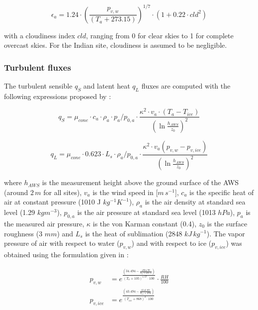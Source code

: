 \begin{equation}
	\epsilon_a=1.24 \cdot (\frac{p_{v,w}}{(T_a+273.15)})^{1/7}\cdot(1+0.22\cdot{cld}^2) \label{eqn:atm_e}
\end{equation}

with a cloudiness index $cld$, ranging from 0 for clear skies to 1 for complete overcast skies. For the Indian
site, cloudiness is assumed to be negligible.

\subsubsection{Turbulent fluxes} \label{sec:Qs}

The turbulent sensible $q_{S}$ and latent heat $q_{L}$ fluxes are computed with the following expressions
proposed by \cite{garrattAtmosphericBoundaryLayer1992}:

\begin{equation}
	q_{S}=\mu_{cone}\cdot c_{a} \cdot \rho_{a} \cdot p_{a}/p_{0,a} \cdot \frac{\kappa^2 \cdot v_a \cdot
		(T_a-T_{ice})}{{(\ln{\frac{h_{AWS}}{z_{0}}})}^2}
	\label{eqn:qs}
\end{equation}

\begin{equation}
	q_{L}=\mu_{cone}\cdot 0.623 \cdot L_s \cdot \rho_{a}/p_{0,a} \cdot \frac{\kappa^2 \cdot
	v_a(p_{v,w}-p_{v,ice})}{{(\ln{\frac{h_{AWS}}{z_{0}}})}^2}
\end{equation}

where $h_{AWS}$ is the measurement height above the ground surface of the \ac{AWS} (around $2\,m$ for all sites),
$v_a$ is the wind speed in [$m\,s^{-1}$], $c_a$ is the specific heat of air at constant pressure (1010 J
$kg^{-1} K^{-1}$), $\rho_{a}$ is the air density at standard sea level (1.29 $kg m^{-3}$), $p_{0,a}$ is the air
pressure at standard sea level (1013 $hPa$), $p_{a}$ is the measured air pressure, $\kappa$ is the von Karman
constant (0.4), $z_{0}$ is the surface roughness (3 $mm$) and $L_s$ is the heat of sublimation (2848
$kJ\,kg^{-1}$). The vapor pressure of air with respect to water ($p_{v,w}$) and with respect to ice
($p_{v,ice}$) was obtained using the formulation given in \cite{huangSimpleAccurateFormula2018} :

\begin{equation}
	\begin{split}
		p_{v,w}&=e^{\frac{(34.494 - \frac{4924.99}{T_{a} + 237.1})}{(T_a + 105)^{1.57} \cdot 100}} \cdot \frac{RH}{100} \\
		p_{v,ice}&=e^{\frac{(43.494 - \frac{6545.89}{T_{ice} + 278})}{(T_{ice} + 868)^{2} \cdot 100}} \\
	\end{split} \label{eqn:vp}
\end{equation}

